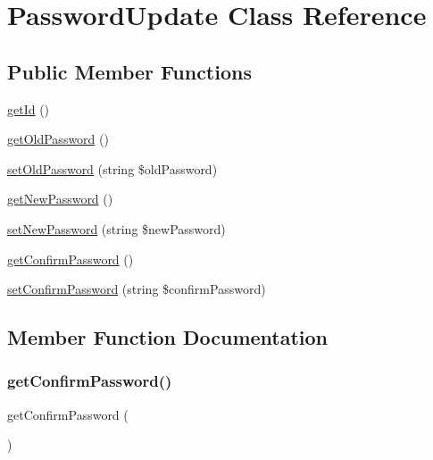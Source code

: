 \hypertarget{class_app_1_1_entity_1_1_password_update}{}\section{Password\+Update Class Reference}
\label{class_app_1_1_entity_1_1_password_update}
\subsection*{Public Member Functions}
\begin{DoxyCompactItemize}
\item 
\mbox{\hyperlink{class_app_1_1_entity_1_1_password_update_a12251d0c022e9e21c137a105ff683f13}{get\+Id}} ()
\item 
\mbox{\hyperlink{class_app_1_1_entity_1_1_password_update_aa6e56306428633e48e4d42ca42edaf40}{get\+Old\+Password}} ()
\item 
\mbox{\hyperlink{class_app_1_1_entity_1_1_password_update_aab87f5666a68bcdc134a882c3d15fd25}{set\+Old\+Password}} (string \$old\+Password)
\item 
\mbox{\hyperlink{class_app_1_1_entity_1_1_password_update_a6bc68729d453aaf6ba5cdbb020e35de9}{get\+New\+Password}} ()
\item 
\mbox{\hyperlink{class_app_1_1_entity_1_1_password_update_aace9cea053ed88d25bad2419046e75d6}{set\+New\+Password}} (string \$new\+Password)
\item 
\mbox{\hyperlink{class_app_1_1_entity_1_1_password_update_a1f4b6c2ade6e249865552d9e32b45d2a}{get\+Confirm\+Password}} ()
\item 
\mbox{\hyperlink{class_app_1_1_entity_1_1_password_update_ab5ae3d6624c1d03e993863d084ea0083}{set\+Confirm\+Password}} (string \$confirm\+Password)
\end{DoxyCompactItemize}


\subsection{Member Function Documentation}
\mbox{\label{class_app_1_1_entity_1_1_password_update_a1f4b6c2ade6e249865552d9e32b45d2a}} 
\subsubsection{\texorpdfstring{getConfirmPassword()}{getConfirmPassword()}}
{\footnotesize\ttfamily get\+Confirm\+Password (\begin{DoxyParamCaption}{ }\end{DoxyParamCaption})}

